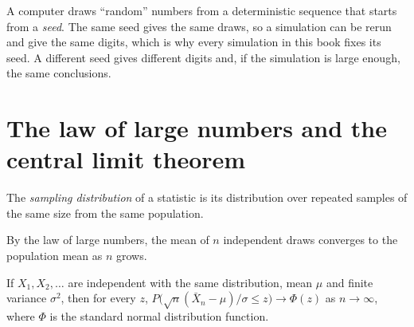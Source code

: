 \label{lst:b1:random-variables-for-econometrics:build-t}

\label{out:b1:random-variables-for-econometrics:build-t}

\begin{measure}
A computer draws ``random'' numbers from a deterministic sequence that
starts from a \emph{seed}. The same seed gives the same draws, so a
simulation can be rerun and give the same digits, which is why every
simulation in this book fixes its seed. A different seed gives different
digits and, if the simulation is large enough, the same conclusions.
\end{measure}

\section{The law of large numbers and the central limit theorem}\label{sec:b1:random-variables-for-econometrics:clt}

\begin{definition}\label{def:b1:random-variables-for-econometrics:sampling-distribution}
The \emph{sampling distribution} of a statistic is its distribution over
repeated samples of the same size from the same population.
\end{definition}

By the law of large numbers, the mean of $n$ independent draws converges to
the population mean as $n$ grows.

\label{lst:b1:random-variables-for-econometrics:lln}

\label{out:b1:random-variables-for-econometrics:lln}

\begin{theorem}\label{thm:b1:random-variables-for-econometrics:clt}
If $X_1, X_2, \dots$ are independent with the same distribution, mean $\mu$ and finite variance
$\sigma^2$, then for every $z$, $P\big(\sqrt n(\bar X_n - \mu)/\sigma \le z\big) \to \Phi(z)$ as $n \to \infty$, where $\Phi$ is the standard
normal distribution function.
\end{theorem}

